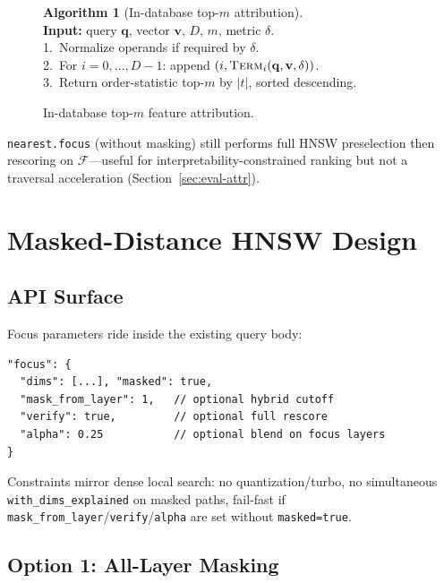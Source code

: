 \documentclass[11pt,a4paper]{article}
\begin{document}
\begin{figure}[htbp]
\centering
\begin{minipage}{0.92\linewidth}
\small
\textbf{Algorithm 1} (In-database top-$m$ attribution).\\
\textbf{Input:} query $\mathbf{q}$, vector $\mathbf{v}$, $D$, $m$, metric $\delta$.\\
1.\ Normalize operands if required by $\delta$.\\
2.\ For $i=0,\ldots,D-1$: append $(i,\textsc{Term}_i(\mathbf{q},\mathbf{v},\delta))$.\\
3.\ Return order-statistic top-$m$ by $|t|$, sorted descending.
\end{minipage}
\caption{In-database top-$m$ feature attribution.}
\label{alg:attribution}
\end{figure}

\texttt{nearest.focus} (without masking) still performs full HNSW preselection
then rescoring on $\mathcal{F}$---useful for interpretability-constrained ranking
but not a traversal acceleration (Section~\ref{sec:eval-attr}).

\section{Masked-Distance HNSW Design}
\label{sec:masked}

\subsection{API Surface}

Focus parameters ride inside the existing query body:
\begin{verbatim}
"focus": {
  "dims": [...], "masked": true,
  "mask_from_layer": 1,   // optional hybrid cutoff
  "verify": true,         // optional full rescore
  "alpha": 0.25           // optional blend on focus layers
}
\end{verbatim}
Constraints mirror dense local search: no quantization/turbo, no simultaneous
\texttt{with\_dims\_explained} on masked paths, fail-fast if
\texttt{mask\_from\_layer}/\texttt{verify}/\texttt{alpha} are set without
\texttt{masked=true}.

\subsection{Option 1: All-Layer Masking}
\end{document}
